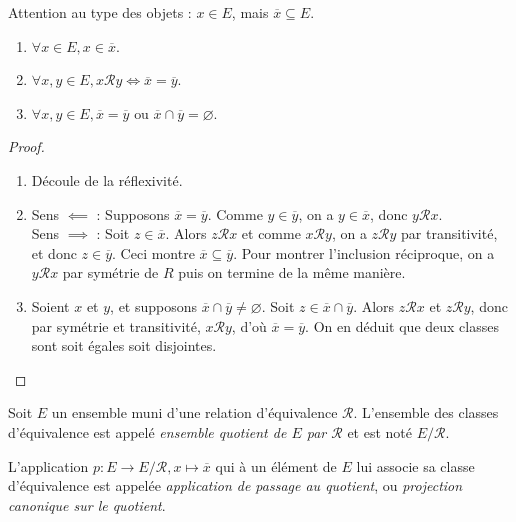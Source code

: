 Attention au type des objets : $x \in E$, mais $\overline{x} \subseteq E$.

\begin{proposition}
\begin{enumerate}
\item $\forall x\in E, x\in \overline{x}$.
\item $\forall x, y\in E, x{\mathcal R}y \iff \overline{x}=\overline{y}$.
\item $\forall x, y\in E, \overline{x} = \overline{y} \text{ ou } \overline{x}\cap \overline{y}=\varnothing$.
\end{enumerate}
\end{proposition}
\begin{proof}
\begin{enumerate}
\item Découle de la réflexivité.
\item Sens $\impliedby$ : Supposons $\overline{x}=\overline{y}$. Comme $y\in \overline{y}$, on a $y\in \overline{x}$, donc $y{\mathcal R}x$.\\
Sens $\implies$ : Soit $z\in \overline{x}$. Alors $z{\mathcal R}x$ et comme $x{\mathcal R}y$, on a $z{\mathcal R}y$ par transitivité, et donc $z\in \overline{y}$. Ceci montre $\overline{x}\subseteq \overline{y}$. Pour montrer l'inclusion réciproque, on a $y{\mathcal R}x$ par symétrie de $R$ puis on termine de la même manière.
\item Soient $x$ et $y$, et supposons $\overline{x}\cap \overline{y} \neq \varnothing$. Soit $z\in \overline{x}\cap \overline{y}$. Alors $z\mathcal R x$ et $z\mathcal R y$, donc par symétrie et transitivité, $x\mathcal R y$, d'où $\overline{x}=\overline{y}$. On en déduit que deux classes sont soit égales soit disjointes.
\end{enumerate}
\end{proof}

\begin{definition}
Soit $E$ un ensemble muni d'une relation d'équivalence ${\mathcal R}$.
L'ensemble des classes d'équivalence est appelé \emph{ensemble quotient de $E$ par $\mathcal R$} et est noté $E/{\mathcal R}$.

L'application $p : E \to E/\mathcal R, x\mapsto \overline{x}$ qui à un élément de $E$ lui associe sa classe d'équivalence est appelée \emph{application de passage au quotient}, ou \emph{projection canonique sur le quotient}.
\end{definition}

